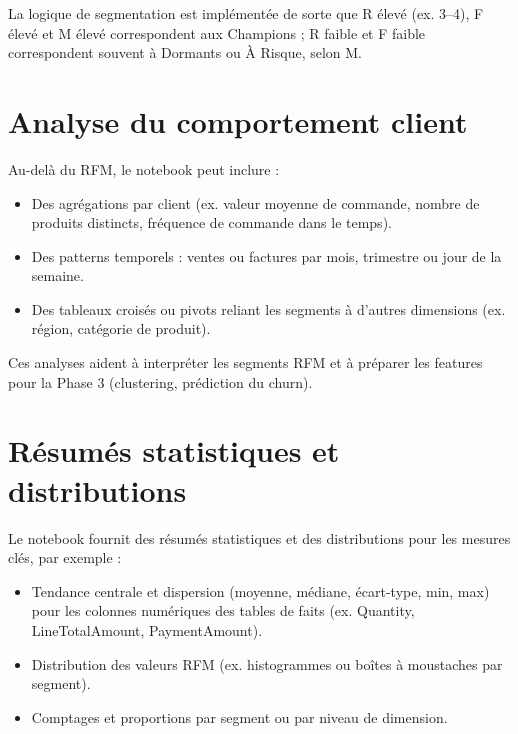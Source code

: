 \documentclass[11pt,a4paper]{article}
\begin{document}
La logique de segmentation est implémentée de sorte que R élevé (ex. 3--4), F élevé et M élevé correspondent aux Champions ; R faible et F faible correspondent souvent à Dormants ou À Risque, selon M.

\section{Analyse du comportement client}

Au-delà du RFM, le notebook peut inclure :
\begin{itemize}[noitemsep]
  \item Des agrégations par client (ex. valeur moyenne de commande, nombre de produits distincts, fréquence de commande dans le temps).
  \item Des patterns temporels : ventes ou factures par mois, trimestre ou jour de la semaine.
  \item Des tableaux croisés ou pivots reliant les segments à d'autres dimensions (ex. région, catégorie de produit).
\end{itemize}

Ces analyses aident à interpréter les segments RFM et à préparer les features pour la Phase 3 (clustering, prédiction du churn).

\section{Résumés statistiques et distributions}

Le notebook fournit des résumés statistiques et des distributions pour les mesures clés, par exemple :
\begin{itemize}[noitemsep]
  \item Tendance centrale et dispersion (moyenne, médiane, écart-type, min, max) pour les colonnes numériques des tables de faits (ex. Quantity, LineTotalAmount, PaymentAmount).
  \item Distribution des valeurs RFM (ex. histogrammes ou boîtes à moustaches par segment).
  \item Comptages et proportions par segment ou par niveau de dimension.
\end{itemize}
\end{document}
